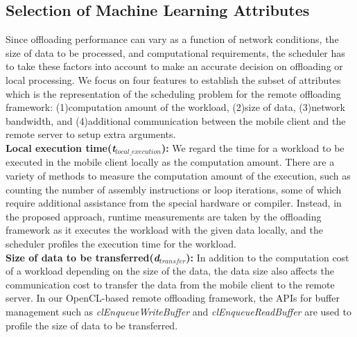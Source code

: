 \documentclass[10pt, conference, compsocconf]{IEEEtran}
\begin{document}
\subsection{Selection of Machine Learning Attributes}
Since offloading performance can vary as a function of network
conditions, the size of data to be processed, and computational
requirements, the scheduler has to take these factors into account to
make an accurate decision on offloading or local processing.
%
We focus on four features to establish the subset of
attributes which is the representation of the scheduling problem for the
remote offloading framework: (1)computation amount of the workload, 
(2)size of data, (3)network bandwidth, and (4)additional communication 
between the mobile client and the remote server to setup extra arguments.\\
%
\textbf{Local execution time(\textit{t$_{local\_execution}$}):} 
We regard the time for a workload to be executed in the mobile client 
locally as the computation amount. 
%
There are a variety of methods to measure the computation amount of the
execution, such as counting the number of assembly instructions or loop
iterations, some of which require additional assistance from the special
hardware or compiler.
%
Instead, in the proposed approach, runtime measurements are taken by the
offloading framework as it executes the workload with the given data
locally, and the scheduler profiles the execution time for the
workload.\\
%
%
%
\textbf{Size of data to be transferred(\textit{d$_{transfer}$}):}
In addition to the computation cost of a workload depending on the size
of the data, the data size also affects the communication cost to
transfer the data from the mobile client to the remote server.
%
%
In our OpenCL-based remote offloading framework, the APIs for buffer
management such as \textit{clEnqueueWriteBuffer} and
\textit{clEnqueueReadBuffer} are used to profile the size of data to be
transferred.\\
\end{document}
